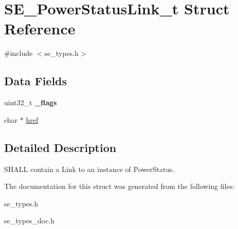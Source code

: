 \hypertarget{structSE__PowerStatusLink__t}{}\section{S\+E\+\_\+\+Power\+Status\+Link\+\_\+t Struct Reference}
\label{structSE__PowerStatusLink__t}


{\ttfamily \#include $<$se\+\_\+types.\+h$>$}

\subsection*{Data Fields}
\begin{DoxyCompactItemize}
\item 
uint32\+\_\+t {\bfseries \+\_\+flags}
\item 
char $\ast$ \hyperlink{group__PowerStatusLink_ga82f194c75d26e2bb601357ecf4549fd8}{href}
\end{DoxyCompactItemize}


\subsection{Detailed Description}
S\+H\+A\+LL contain a Link to an instance of Power\+Status. 

The documentation for this struct was generated from the following files\+:\begin{DoxyCompactItemize}
\item 
se\+\_\+types.\+h\item 
se\+\_\+types\+\_\+doc.\+h\end{DoxyCompactItemize}

